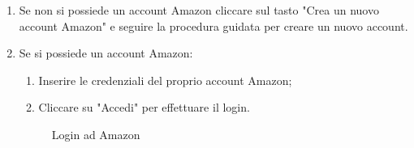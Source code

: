 \begin{enumerate}
\item Se non si possiede un account Amazon cliccare sul tasto "Crea un nuovo account Amazon" e seguire la procedura guidata per creare un nuovo account.
\item Se si possiede un account Amazon:
\begin{enumerate}
	\item Inserire le credenziali del proprio account Amazon;
	\item Cliccare su "Accedi" per effettuare il login.
\end{enumerate}
\begin{figure}[!ht]
	\centering
	\caption{Login ad Amazon}
\end{figure}
\end{enumerate}
\newpage

